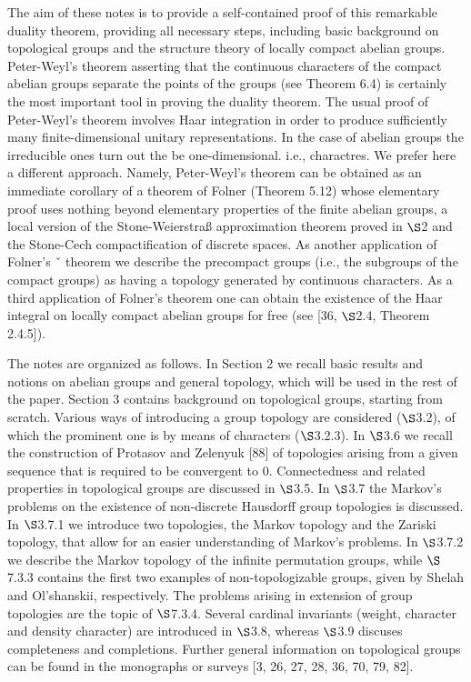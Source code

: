 \documentclass[12pt]{article}
\begin{document}
    The aim of these notes is to provide a self-contained proof of this remarkable duality theorem, providing all
necessary steps, including basic background on topological groups and the structure theory of locally compact
abelian groups. Peter-Weyl's theorem asserting that the continuous characters of the compact abelian groups
separate the points of the groups (see Theorem 6.4) is certainly the most important tool in proving the duality
theorem. The usual proof of Peter-Weyl's theorem involves Haar integration in order to produce sufficiently
many finite-dimensional unitary representations. In the case of abelian groups the irreducible ones turn out the
be one-dimensional. i.e., charactres. We prefer here a different approach. Namely, Peter-Weyl's theorem can be
obtained as an immediate corollary of a theorem of Folner (Theorem 5.12) whose elementary proof uses nothing
beyond elementary properties of the finite abelian groups, a local version of the Stone-Weierstraß approximation
theorem proved in $ \S $2 and the Stone-Cech compactification of discrete spaces. As another application of Folner's ˇ
theorem we describe the precompact groups (i.e., the subgroups of the compact groups) as having a topology
generated by continuous characters. As a third application of Folner's theorem one can obtain the existence of
the Haar integral on locally compact abelian groups for free (see [36, $ \S $2.4, Theorem 2.4.5]).
    

    The notes are organized as follows. In Section 2 we recall basic results and notions on abelian groups and
general topology, which will be used in the rest of the paper. Section 3 contains background on topological
groups, starting from scratch. Various ways of introducing a group topology are considered ($ \S $3.2), of which the
prominent one is by means of characters ($ \S $3.2.3). In $ \S $3.6 we recall the construction of Protasov and Zelenyuk
[88] of topologies arising from a given sequence that is required to be convergent to 0. Connectedness and
related properties in topological groups are discussed in $ \S $3.5. In $ \S $3.7 the Markov's problems on the existence
of non-discrete Hausdorff group topologies is discussed. In $ \S $3.7.1 we introduce two topologies, the Markov
topology and the Zariski topology, that allow for an easier understanding of Markov's problems. In $ \S $3.7.2 we
describe the Markov topology of the infinite permutation groups, while $ \S $7.3.3 contains the first two examples
of non-topologizable groups, given by Shelah and Ol'shanskii, respectively. The problems arising in extension
of group topologies are the topic of $ \S $7.3.4. Several cardinal invariants (weight, character and density character)
are introduced in $ \S $3.8, whereas $ \S $3.9 discuses completeness and completions. Further general information on
topological groups can be found in the monographs or surveys [3, 26, 27, 28, 36, 70, 79, 82].
\end{document}
